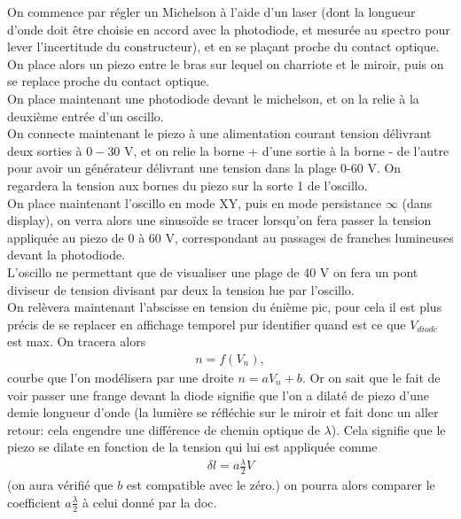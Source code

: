 \documentclass[12pt,prb,aps,epsf]{article}
\begin{document}
On commence par régler un Michelson à l'aide d'un laser (dont la longueur d'onde doit être choisie en accord avec la photodiode, et mesurée au spectro pour lever l'incertitude du constructeur), et en se plaçant proche du contact optique.\\ 
On place alors un piezo entre le bras sur lequel on charriote et le miroir, puis on se replace proche du contact optique.\\ 
On place maintenant une photodiode devant le michelson, et on la relie à la deuxième entrée d'un oscillo.\\
On connecte maintenant le piezo à une alimentation courant tension délivrant deux sorties à $0-30$ V, et on relie la borne + d'une sortie à la borne - de l'autre pour avoir un générateur délivrant une tension dans la plage 0-60 V. On regardera la tension aux bornes du piezo sur la sorte 1 de l'oscillo.\\

On place maintenant l'oscillo en mode XY, puis en mode persistance $\infty$ (dans display), on verra alors une sinusoïde se tracer lorsqu'on fera passer la tension appliquée au piezo de 0 à 60 V, correspondant au passages de franches lumineuses devant la photodiode. \\
L'oscillo ne permettant que de visualiser une plage de 40 V on fera un pont diviseur de tension divisant par deux la tension lue par l'oscillo.\\

On relèvera maintenant l'abscisse en tension du énième pic, pour cela il est plus précis de se replacer en affichage temporel pur identifier quand est ce que $V_{diode}$ est max. On tracera alors 
\begin{eqnarray}
n = f(V_n),
\end{eqnarray}
courbe que l'on modélisera par une droite $n = aV_n + b$. Or on sait que le fait de voir passer une frange devant la diode signifie que l'on a dilaté de piezo d'une demie longueur d'onde (la lumière se réfléchie sur le miroir et fait donc un aller retour: cela engendre une différence de chemin optique de $\lambda$). Cela signifie que le piezo se dilate en fonction de la tension qui lui est appliquée comme 
\begin{eqnarray}
\delta l = a\frac{\lambda}{2}V
\end{eqnarray}
(on aura vérifié que $b$ est compatible avec le zéro.)
on pourra alors comparer le coefficient $a\frac{\lambda}{2}$ à celui donné par la doc.\\
\end{document}
